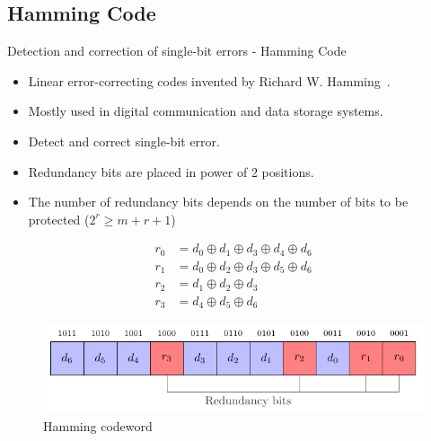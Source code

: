\subsection{Hamming Code}
    \begin{frame}{Detection and correction of single-bit errors - Hamming Code}
        \begin{block}{}
            \begin{itemize}
                \justifying
                \item Linear error-correcting codes invented by Richard W. Hamming~\cite{H-50-bstj}.
                \item Mostly used in digital communication and data storage systems.
                \item Detect and correct single-bit error.
                \item Redundancy bits are placed in power of 2 positions.
                \item The number of redundancy bits depends on the number of bits to be protected {\scriptsize ($ 2^r \ge m + r + 1 $)}
            \end{itemize}
        \end{block}

        \begin{minipage}[c]{0.4\linewidth}
            \begin{equation} \label{equat:hamming_encoder}
                \begin{split}
                    r_{0} &= d_{0} \oplus d_{1} \oplus d_{3} \oplus d_{4} \oplus d_{6} \\
                    r_{1} &= d_{0} \oplus d_{2} \oplus d_{3} \oplus d_{5} \oplus d_{6} \\
                    r_{2} &= d_{1} \oplus d_{2} \oplus d_{3} \\
                    r_{3} &= d_{4} \oplus d_{5} \oplus d_{6}
                \end{split}
            \end{equation}
        \end{minipage}\hfill%
        \begin{minipage}[c]{0.55\linewidth}
            \begin{figure}
                \centering
                \includegraphics[width=\textwidth, page=1]{src/3_strategies/img/hamming_bit.pdf}
                \caption{Hamming codeword}
                \label{fig:hamming_codeword}
            \end{figure}
        \end{minipage}
    \end{frame}
    
